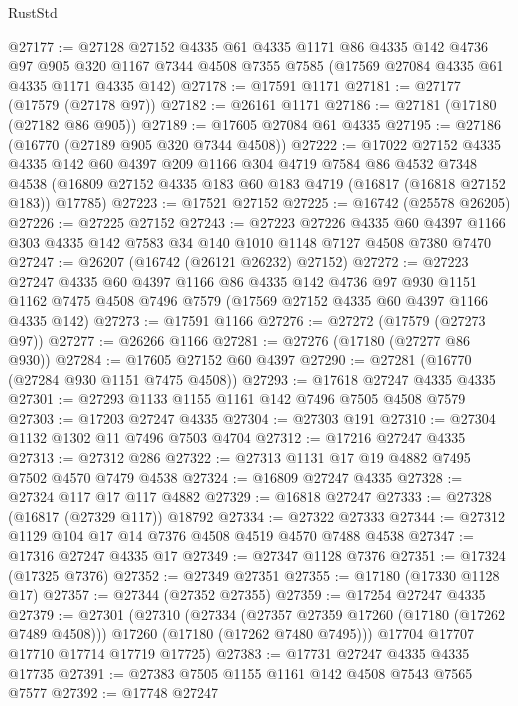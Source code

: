 \begin{lexlean}{RustStd}
\begin{coremodule}
{\begin{coremodule}
{{{{{{{{{{{{{{{{{{{{{{{{{{{{{{{{{{{{{{{{{{{{{{{{{{{{{{{@27177 := @27128
    @27152
    @4335
    @61
    @4335
    @1171
    @86
    @4335
    @142
    @4736
    @97
    @905
    @320
    @1167
    @7344
    @4508
    @7355
    @7585
    (@17569 @27084 @4335 @61 @4335 @1171 @4335 @142)
@27178 := @17591 @1171
@27181 := @27177 (@17579 (@27178 @97))
@27182 := @26161 @1171
@27186 := @27181 (@17180 (@27182 @86 @905))
@27189 := @17605 @27084 @61 @4335
@27195 := @27186 (@16770 (@27189 @905 @320 @7344 @4508))
@27222 := @17022
    @27152
    @4335
    @4335
    @142
    @60
    @4397
    @209
    @1166
    @304
    @4719
    @7584
    @86
    @4532
    @7348
    @4538
    (@16809 @27152 @4335 @183 @60 @183 @4719 (@16817 (@16818 @27152 @183)) @17785)
@27223 := @17521 @27152
@27225 := @16742 (@25578 @26205)
@27226 := @27225 @27152
@27243 := @27223
    @27226
    @4335
    @60
    @4397
    @1166
    @303
    @4335
    @142
    @7583
    @34
    @140
    @1010
    @1148
    @7127
    @4508
    @7380
    @7470
@27247 := @26207 (@16742 (@26121 @26232) @27152)
@27272 := @27223
    @27247
    @4335
    @60
    @4397
    @1166
    @86
    @4335
    @142
    @4736
    @97
    @930
    @1151
    @1162
    @7475
    @4508
    @7496
    @7579
    (@17569 @27152 @4335 @60 @4397 @1166 @4335 @142)
@27273 := @17591 @1166
@27276 := @27272 (@17579 (@27273 @97))
@27277 := @26266 @1166
@27281 := @27276 (@17180 (@27277 @86 @930))
@27284 := @17605 @27152 @60 @4397
@27290 := @27281 (@16770 (@27284 @930 @1151 @7475 @4508))
@27293 := @17618 @27247 @4335 @4335
@27301 := @27293 @1133 @1155 @1161 @142 @7496 @7505 @4508 @7579
@27303 := @17203 @27247 @4335
@27304 := @27303 @191
@27310 := @27304 @1132 @1302 @11 @7496 @7503 @4704
@27312 := @17216 @27247 @4335
@27313 := @27312 @286
@27322 := @27313 @1131 @17 @19 @4882 @7495 @7502 @4570 @7479 @4538
@27324 := @16809 @27247 @4335
@27328 := @27324 @117 @17 @117 @4882
@27329 := @16818 @27247
@27333 := @27328 (@16817 (@27329 @117)) @18792
@27334 := @27322 @27333
@27344 := @27312 @1129 @104 @17 @14 @7376 @4508 @4519 @4570 @7488 @4538
@27347 := @17316 @27247 @4335 @17
@27349 := @27347 @1128 @7376
@27351 := @17324 (@17325 @7376)
@27352 := @27349 @27351
@27355 := @17180 (@17330 @1128 @17)
@27357 := @27344 (@27352 @27355)
@27359 := @17254 @27247 @4335
@27379 := @27301
    (@27310
      (@27334
        (@27357 @27359 @17260 (@17180 (@17262 @7489 @4508)))
        @17260
        (@17180 (@17262 @7480 @7495)))
      @17704
      @17707
      @17710
      @17714
      @17719
      @17725)
@27383 := @17731 @27247 @4335 @4335 @17735
@27391 := @27383 @7505 @1155 @1161 @142 @4508 @7543 @7565 @7577
@27392 := @17748 @27247
}}}}}}}}}}}}}}}}}}}}}}}}}}}}}}}}}}}}}}}}}}}}}}}}}}}}}}}
\end{coremodule}}
\end{coremodule}
\end{lexlean}
